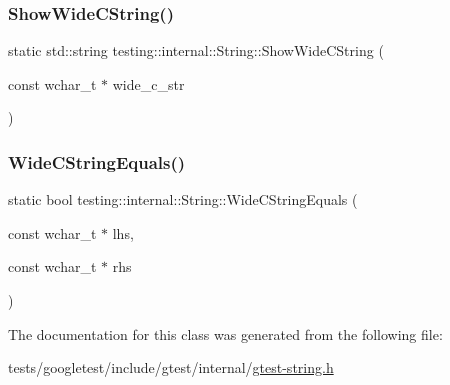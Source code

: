 \mbox{\label{classtesting_1_1internal_1_1String_acbf0511e9ae5009f42de77e565f6ba61}} 
\subsubsection{\texorpdfstring{Show\+Wide\+C\+String()}{ShowWideCString()}}
{\footnotesize\ttfamily static std\+::string testing\+::internal\+::\+String\+::\+Show\+Wide\+C\+String (\begin{DoxyParamCaption}\item[{const wchar\+\_\+t $\ast$}]{wide\+\_\+c\+\_\+str }\end{DoxyParamCaption})\hspace{0.3cm}{\ttfamily [static]}}

\mbox{\label{classtesting_1_1internal_1_1String_a4f5e053907ebced07fe0dc52dd2d1e85}} 
\subsubsection{\texorpdfstring{Wide\+C\+String\+Equals()}{WideCStringEquals()}}
{\footnotesize\ttfamily static bool testing\+::internal\+::\+String\+::\+Wide\+C\+String\+Equals (\begin{DoxyParamCaption}\item[{const wchar\+\_\+t $\ast$}]{lhs,  }\item[{const wchar\+\_\+t $\ast$}]{rhs }\end{DoxyParamCaption})\hspace{0.3cm}{\ttfamily [static]}}



The documentation for this class was generated from the following file\+:\begin{DoxyCompactItemize}
\item 
tests/googletest/include/gtest/internal/\hyperlink{gtest-string_8h}{gtest-\/string.\+h}\end{DoxyCompactItemize}
